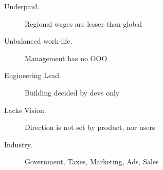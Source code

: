 \documentclass[10pt, a4paper, twocolumn]{article}
\begin{document}
\begin{description}
 \item[Underpaid.] Regional wages are lesser than global
  \item[Unbalanced work-life.] Management has no OOO
    \item[Engineering Lead.] Building decided by devs only
 \item[Lacks Vision.] Direction is not set by product, nor users
  \item[Industry.] Government, Taxes, Marketing, Ads, Sales
\end{description}





%
%
%
%
%
\end{document}
